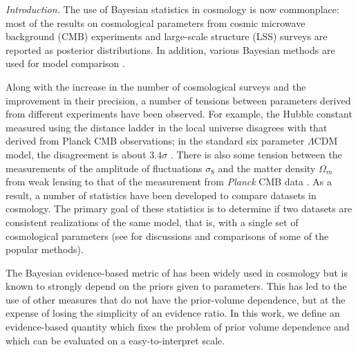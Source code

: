 \documentclass[amsmath, prl, reprint, aps]{revtex4-1}
\newcommand{\saroj}[1]{\textcolor{blue}{(Saroj: #1)}}
\begin{document}
    \maketitle
    \medskip
    \textit{Introduction.}
    The use of Bayesian statistics in cosmology is now commonplace: most of the results on cosmological parameters from cosmic microwave background (CMB) experiments \cite{Ade:2015xua} and large-scale structure (LSS) surveys \cite{Abbott:2017wau} are reported as posterior distributions. In addition, various Bayesian methods are used for model comparison \cite{Trotta:2008qt}.
    
    Along with the increase in the number of cosmological surveys and the improvement in their precision, a number of tensions between  parameters derived from different experiments have been observed. For example, the Hubble constant measured using the distance ladder in the local universe disagrees with that derived from Planck CMB observations; in the standard six parameter $\Lambda$CDM model, the disagreement is about $3.4\sigma$ \cite{Riess:2016jrr, Bernal:2016gxb}. There is also some tension between the measurements of the amplitude of fluctuations $\sigma_8$ and the matter density $\Omega_m$ from weak lensing to that of the measurement from {\it Planck} CMB data \citep{Hildebrandt:2016iqg,Troxel:2017xyo,Troxel:2018qll}. As a result, a number of statistics have been developed to compare datasets in cosmology. The primary goal of these statistics is to determine if two datasets are consistent realizations of the same model, that is, with a single set of cosmological parameters (see \cite{Seehars:2015qza, Charnock:2017vcd, Lin:2017ikq} for discussions and comparisons of some of the popular methods). 
    
    The Bayesian evidence-based metric of \cite{Marshall:2004zd} has been widely used in cosmology \cite{March:2011rv, Amendola:2012wc, Joudaki:2016mvz, Raveri:2015maa} but is known to strongly depend on the priors given to parameters. This has led to the use of other measures \cite{Seehars:2014ora,Grandis:2016fwl, Feeney:2018mkj} that do not have the prior-volume dependence, but at the expense of losing the simplicity of an evidence ratio. 
    In this work, we define an evidence-based quantity which fixes the problem of prior volume dependence and which can be evaluated on a easy-to-interpret scale.
    
\end{document}
